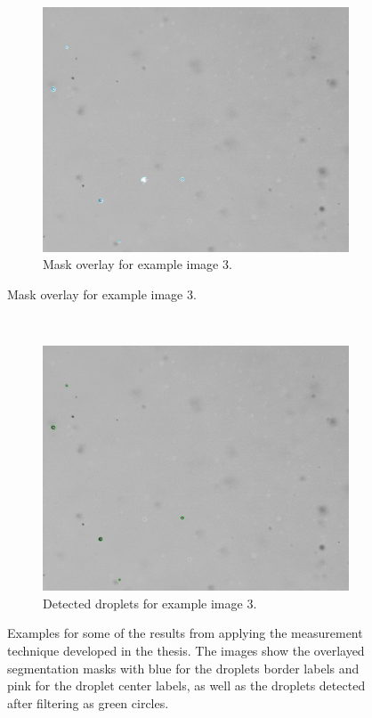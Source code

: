 ~
\vfill
~
\begin{figure}[htbp]\ContinuedFloat
    \centering
    \begin{subfigure}{\textwidth}
        \centering
            \includegraphics[width=\textwidth]{images/samples/36dbm_C001H001S0001000206_leftImg8bit_overlay.jpeg}
        \caption{Mask overlay for example image 3.}
    \end{subfigure}
\end{figure}
\vfill
~
\vfill
\begin{figure}[htbp]\ContinuedFloat
    \begin{subfigure}{\textwidth}
        \centering
            \includegraphics[width=\textwidth]{images/samples/36dbm_C001H001S0001000206_leftImg8bit_detected.jpeg}
        \caption{Detected droplets for example image 3.}
    \end{subfigure}
    \caption{Examples for some of the results from applying the measurement technique developed in the thesis. The images show the overlayed segmentation masks with blue for the droplets border labels and pink for the droplet center labels, as well as the droplets detected after filtering as green circles.}
    \label{fig:example_images}
\end{figure}
